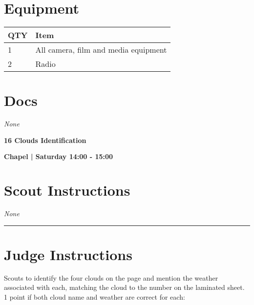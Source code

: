 \documentclass[10pt]{article}
\newcommand{\newtitle}[1]{\begin{center}{\Huge\bfseries #1 }\\ \vspace{5mm}\end{center}}
\newcommand{\newsubtitle}[1]{\begin{center}{\color{grey}\Large\bfseries #1 }\\ \vspace{5mm}\end{center}}
\begin{document}
	\begin{multicols}{2}

		\section*{\faWrench \: Equipment}

		
	\begin{center}
			\begin{tabular}{p{2cm}p{4cm}}


				\textbf{QTY} & \textbf{Item} \\\toprule
												1&All camera, film and media equipment\\\midrule
												2&Radio\\\midrule
								\end{tabular}

			\end{center}

		
		\vfill\null
		\columnbreak

			\section*{\faFile \: Docs}
		 	\textit{None}
	

		\vfill\null

		\end{multicols}



	\vspace{1cm}


	\clearpage
		\newtitle{16 Clouds Identification }
	\newsubtitle{Chapel | Saturday 14:00 - 15:00}
		\setcounter{section}{15}
	\section*{Scout Instructions}
		\textit{None}
	
	\vspace{0.5cm}
	\hrule
	\vspace{0.5cm}

		\section*{Judge Instructions}
		Scouts to identify the four clouds on the page and mention the weather associated with each, matching the cloud to the number on the laminated sheet. 1 point if both cloud name and weather are correct for each:
\end{document}
